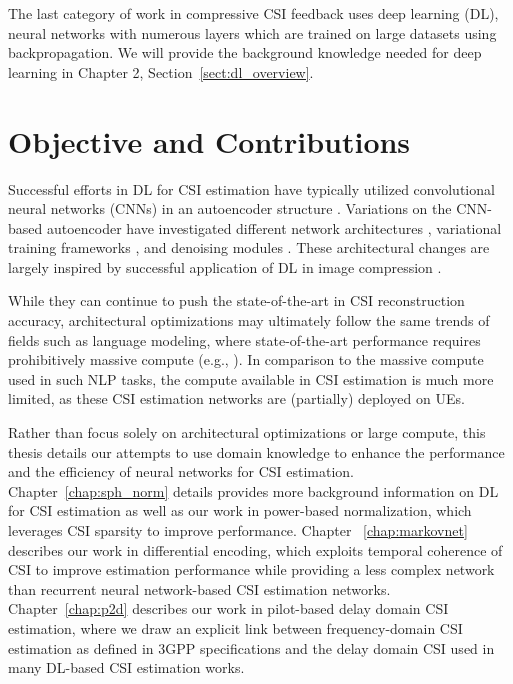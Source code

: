 The last category of work in compressive CSI feedback uses deep learning (DL), neural networks with numerous layers which are trained on large datasets using backpropagation. We will provide the background knowledge needed for deep learning in Chapter 2, Section~\ref{sect:dl_overview}.

\section{Objective and Contributions}

Successful efforts in DL for CSI estimation have typically utilized convolutional neural networks (CNNs) in an autoencoder structure \cite{ref:csinet}. Variations on the CNN-based autoencoder have investigated different network architectures \cite{ref:Lu2020CRNet}, variational training frameworks \cite{ref:Hussien2020PRVNet}, and denoising modules \cite{ref:Sun2020AnciNet}. These architectural changes are largely inspired by successful application of DL in image compression \cite{ref:szegedy2017inception,ref:balle2017end,ref:xie2012image}.

While they can continue to push the state-of-the-art in CSI reconstruction accuracy, architectural optimizations may ultimately follow the same trends of fields such as language modeling, where state-of-the-art performance requires prohibitively massive compute (e.g., \cite{ref:brown2020language}). In comparison to the massive compute used in such NLP tasks, the compute available in CSI estimation is much more limited, as these CSI estimation networks are (partially) deployed on UEs. 

Rather than focus solely on architectural optimizations or large compute, this thesis details our attempts to use domain knowledge to enhance the performance and the efficiency of neural networks for CSI estimation. Chapter~\ref{chap:sph_norm} details provides more background information on DL for CSI estimation as well as our work in power-based normalization, which leverages CSI sparsity to improve performance. Chapter ~\ref{chap:markovnet} describes our work in differential encoding, which exploits temporal coherence of CSI to improve estimation performance while providing a less complex network than recurrent neural network-based CSI estimation networks. Chapter~\ref{chap:p2d} describes our work in pilot-based delay domain CSI estimation, where we draw an explicit link between frequency-domain CSI estimation as defined in 3GPP specifications and the delay domain CSI used in many DL-based CSI estimation works.

